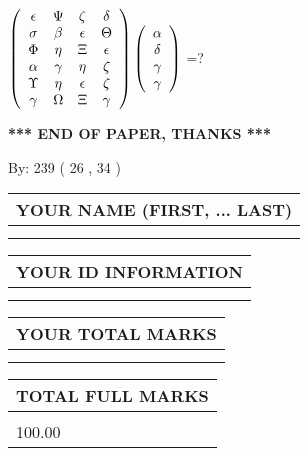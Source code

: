\documentclass[12pt]{article}
\begin{document}
 
$  %
 \left( \begin{array}
 {
 c
 c
 c
 c
 }
 \epsilon & 
 \Psi & 
                    \zeta & 
 \delta \\ 
 \sigma & 
 \beta & 
 \epsilon & 
 \Theta \\ 
 \Phi & 
 \eta & 
                    \Xi & 
 \epsilon \\ 
 \alpha & 
 \gamma & 
 \eta & 
                    \zeta \\ 
 \Upsilon & 
 \eta & 
 \epsilon & 
                    \zeta \\ 
 \gamma & 
 \Omega & 
                    \Xi & 
 \gamma
 \end{array} \right)
 \left( \begin{array}
 {
 c
 }
 \alpha \\ 
 \delta \\ 
 \gamma \\ 
 \gamma
 \end{array} \right)
$ =?
 

 

 
\vspace{0.3in}
   
   
 \vspace{0.2in}
 
   
   
   
   
\vspace{1.0in} 
{\textbf{\large{ *** END OF PAPER, THANKS *** }}} 
   
   
\hspace{1.0in} By: 
 239 ( 26 ,  34 )
   
   
   
   
\newpage 
\setcounter{page}{ 
    28001 } 
   
   
   
   
\noindent\begin{tabular}{|l|}
\hline
YOUR NAME (FIRST, ... LAST)  \\
\hline
 \\ 
 \\ 
\hline
\end{tabular}
\hspace{0.05in} \begin{tabular}{|l|}
\hline
 YOUR   ID   INFORMATION  \\
\hline
 \\ 
 \\ 
\hline
\end{tabular}
   
   
\vspace{0.2in}\noindent\begin{tabular}{|l|}
\hline
YOUR TOTAL MARKS  \\
\hline
 \\ 
 \\ 
\hline
\end{tabular}
\hspace{0.05in} \begin{tabular}{|l|}
\hline
TOTAL FULL MARKS  \\
\hline
 \\ 
100.00 \\
\hline
\end{tabular}
   
\end{document}
